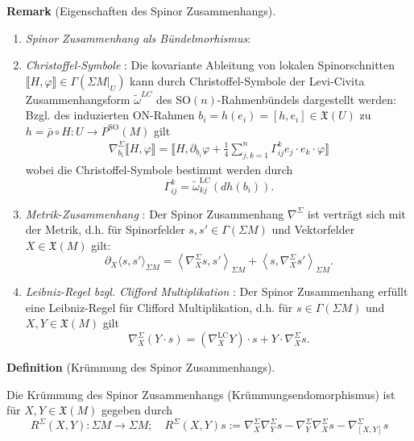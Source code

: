 \documentclass[10pt, letterpaper]{article}
\newcommand{\SO}{\mathrm{SO}}
\newcommand{\CustomHeading}[3]{%
  \par\medskip\noindent%
  \textbf{#1 #2} \textnormal{(#3)}.\enskip%
}
\newenvironment{DEF}[2]{\CustomHeading{Definition}{#1}{#2}}{}
\newenvironment{REM}[2]{\CustomHeading{Remark}{#1}{#2}}{}
\begin{document}
\begin{REM}{}{{\color{blue}Eigenschaften des Spinor Zusammenhangs}}
  \begin{enumerate}
    \item \emph{Spinor Zusammenhang als Bündelmorhismus}:
    \item \emph{Christoffel-Symbole} \parencite[p.~101--102]{BaerSpin}: Die kovariante Ableitung von lokalen Spinorschnitten $\llbracket H, \varphi \rrbracket \in \Gamma(\Sigma M|_U)$ kann durch Christoffel-Symbole der Levi-Civita Zusammenhangsform $\widetilde\omega^{LC}$ des $\SO(n)$-Rahmenbündels dargestellt werden: Bzgl. des induzierten ON-Rahmen $b_i=h(e_i)=[h,e_i]\in\mathfrak{X}(U)$ zu $h=\bar\rho\circ H:U\to P ^\SO(M)$ gilt
    $$
    \begin{aligned}
    \nabla_{b_i}^{\Sigma} \llbracket H, \varphi \rrbracket = \llbracket H, \partial_{b_i} \varphi+\frac{1}{4} \sum_{j, k=1}^n \Gamma_{i j}^k e_j \cdot e_k \cdot \varphi \rrbracket
    \end{aligned}
    $$
    wobei die Christoffel-Symbole bestimmt werden durch 
    $$\Gamma_{i j}^k=\widetilde\omega_{k j}^{\mathrm{LC}}\left(d h\left(b_i\right)\right).$$
    \item \emph{Metrik-Zusammenhang} \parencite[p.~102--103]{BaerSpin}: Der Spinor Zusammenhang $\nabla^\Sigma$ ist verträgt sich mit der Metrik, d.h. für Spinorfelder $s,s'\in\Gamma(\Sigma M)$ und Vektorfelder $X\in\mathfrak{X}(M)$ gilt:
    $$
    \partial_X\langle s, s'\rangle_{\Sigma M}=\left\langle\nabla_X^{\Sigma} s, s'\right\rangle_{\Sigma M}+\left\langle s, \nabla_X^{\Sigma} s'\right\rangle _{\Sigma M}.
    $$
    \item \emph{Leibniz-Regel bzgl. Clifford Multiplikation} \parencite[p.~102--103]{BaerSpin}:  Der Spinor Zusammenhang erfüllt eine Leibniz-Regel für Clifford Multiplikation, d.h. für $s\in\Gamma(\Sigma M)$ und $X, Y \in \mathfrak{X}(M)$ gilt
    $$
    \nabla_X^{\Sigma}(Y \cdot s)=\left(\nabla_X^{\mathrm{LC}} Y\right) \cdot s+Y \cdot \nabla_X^{\Sigma} s.
    $$
  \end{enumerate}
\end{REM}


\begin{DEF}{}{Krümmung des Spinor Zusammenhangs}
  Die Krümmung des Spinor Zusammenhangs (Krümmungsendomorphismus) ist für $X,Y\in\mathfrak{X}(M)$ gegeben durch 
    $$R^{\Sigma}(X, Y): \Sigma M \rightarrow \Sigma M;\quad R^{\Sigma}(X, Y) s:=\nabla_X^{\Sigma} \nabla_Y^{\Sigma} s-\nabla_Y^{\Sigma} \nabla_X^{\Sigma} s-\nabla_{[X, Y]}^{\Sigma} s$$
\end{DEF}
\end{document}

